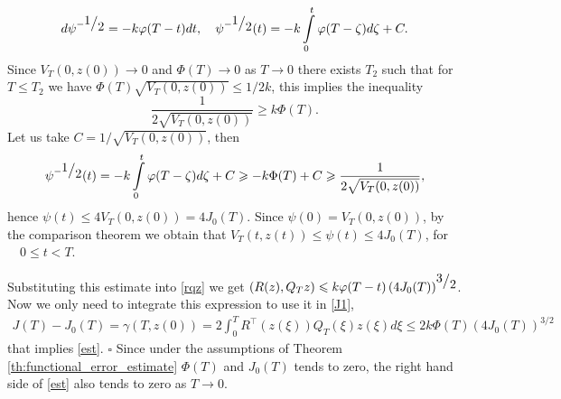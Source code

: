 \documentclass[../main.tex]{subfiles}
\begin{document}
\begin{gather*}
    d\psi^{-\frc{1}{2}} = -k \varphi(T-t) dt, \quad
    \psi^{-\frc{1}{2}}(t) = -k \int\limits_0^t \varphi(T-\zeta) d\zeta + C.
\end{gather*}
Since $V_T(0,z(0))\to 0$ and $\Phi(T) \to 0$ as $T\to 0$ there exists  $T_2$ such that for $T\leqslant T_2$ we have $\Phi(T) \sqrt{V_T(0,z(0))}  \leqslant 1/2k$, this implies the inequality $$\frac{1}{2\sqrt{V_T(0,z(0))}} \geqslant k\Phi(T).$$  
Let us take  $C = 1/\sqrt{V_T(0,z(0))}$, then   
$$\psi^{-\frc{1}{2}}(t) = -k \int\limits_0^t \varphi(T-\zeta) d\zeta + C\geqslant -k\Phi(T)+C\geqslant \frac{1}{2\sqrt{V_T(0,z(0))}}, $$
hence $\psi(t) \leqslant 4V_T(0,z(0))=4J_0(T)$. Since $\psi(0)=V_T(0,z(0))$, by the comparison theorem we obtain
that $V_T(t,z(t))\leqslant \psi(t) \leqslant 4J_0(T)$, for $\quad 0\leqslant t <T$.

Substituting this estimate into \eqref{rqz} we get  $\left( R(z), Q_T z\right) \leqslant k \varphi(T-t) \left( 4J_0(T) \right) ^{\frc{3}{2}} $.
Now we only need to integrate this expression to use it in \eqref{J1},
\begin{gather*}
J(T)-J_0(T)=		\gamma (T,z(0)) = 
		 2\int_{0}^{T}  R^{\top}(z(\xi))Q_T(\xi) z(\xi) d\xi\leqslant 2k \Phi(T) (4J_0(T))^{3/2}
\end{gather*}
that implies \eqref{est}.
	\hfill $ \square $
Since under the assumptions of Theorem \ref{th:functional_error_estimate}  $\Phi(T)$ and $J_0(T)$ tends to zero, the right hand side of \eqref{est} also tends to zero as $T\to 0$.
\end{document}
